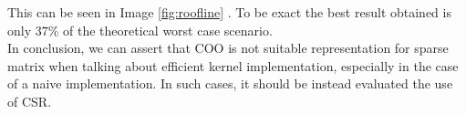 \documentclass[conference]{IEEEtran}
\begin{document}
This can be seen in Image \ref{fig:roofline} . To be exact the best result obtained is only $37\%$ of the theoretical worst case scenario.
\\

In conclusion, we can assert that COO is not suitable representation for sparse matrix when talking about efficient kernel implementation, especially in the case of a naive implementation. In such cases, it should be instead evaluated the use of CSR.
\end{document}
